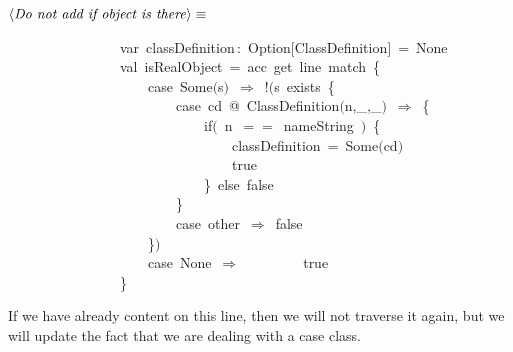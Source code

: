 \documentclass[a4paper,12pt]{article}
\begin{document}
$\left<\mbox{\emph{Do not add if object is there}}\right>\equiv$
\begin{program}~~~~~~~~~~~~~~~~{\vem var}~classDefinition\,{\rm :}~Option$[$ClassDefinition$]$~=~None
\\~~~~~~~~~~~~~~~~{\vem val}~isRealObject~=~acc~get~line~{\vem match}~{\small\{}
\\~~~~~~~~~~~~~~~~~~~~{\vem case}~Some$($s$)$~$\Rightarrow$~!$($s~exists~{\small\{}
\\~~~~~~~~~~~~~~~~~~~~~~~~{\vem case}~cd~@~ClassDefinition$($n,\_,\_$)$~$\Rightarrow$~{\small\{}
\\~~~~~~~~~~~~~~~~~~~~~~~~~~~~{\vem if}$($~n~$==$~nameString~$)$~{\small\{}
\\~~~~~~~~~~~~~~~~~~~~~~~~~~~~~~~~classDefinition~=~Some$($cd$)$
\\~~~~~~~~~~~~~~~~~~~~~~~~~~~~~~~~{\vem true}
\\~~~~~~~~~~~~~~~~~~~~~~~~~~~~{\small\}}~{\vem else}~{\vem false}
\\~~~~~~~~~~~~~~~~~~~~~~~~{\small\}}
\\~~~~~~~~~~~~~~~~~~~~~~~~{\vem case}~other~$\Rightarrow$~{\vem false}
\\~~~~~~~~~~~~~~~~~~~~{\small\}}$)$
\\~~~~~~~~~~~~~~~~~~~~{\vem case}~None~$\Rightarrow$~~~~~~~~~{\vem true}
\\~~~~~~~~~~~~~~~~{\small\}}
\\[0.5em]\end{program}


If we have already content on this line, then we will not traverse it again, but
we will update the fact that we are dealing with a case class.
\end{document}
